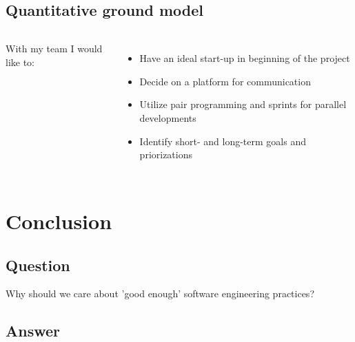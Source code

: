 \documentclass[usenames,dvipsnames]{beamer}
\theoremstyle{plain}
\theoremstyle{definition}
\begin{document}
\subsection{Quantitative ground model}

\begin{frame}{\setframetitle{}}
  \begin{columns}[t]
    With my team I would like to: 
    \begin{itemize}
      \item Have an ideal start-up in beginning of the project 
      
      \item Decide on a platform for communication 
      
      \item Utilize pair programming and sprints for parallel developments
      
      \item Identify short- and long-term goals and priorizations
      
    \end{itemize}
  
  \end{columns}
  
\end{frame}







\section{Conclusion}
\subsection{Question}


\begin{frame}{\setframetitle{}}
  {
\centering


\Large  Why should we care about 'good enough' software engineering practices?

}
\end{frame}

\subsection{Answer}
\end{document}
